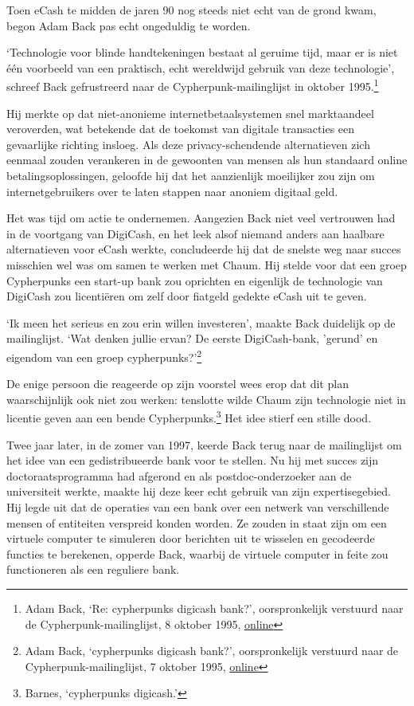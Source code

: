 \documentclass[smalldemyvopaper,11pt,twoside,onecolumn,openright,extrafontsizes,hidelinks]{memoir}
\begin{document}
Toen eCash te midden de jaren 90 nog steeds niet echt van de grond kwam,
begon Adam Back pas echt ongeduldig te worden.

`Technologie voor blinde handtekeningen bestaat al geruime tijd, maar er
is niet één voorbeeld van een praktisch, echt wereldwijd gebruik van
deze technologie', schreef Back gefrustreerd naar de
Cypherpunk-mailinglijst in oktober 1995.\footnote{Adam Back, `Re:
  cypherpunks digicash bank?', oorspronkelijk verstuurd naar de
  Cypherpunk-mailinglijst, 8 oktober 1995,
  \href{https://cypherpunks.venona.com/date/1995/10/msg00734.html}{online}}

Hij merkte op dat niet-anonieme internetbetaalsystemen snel marktaandeel
veroverden, wat betekende dat de toekomst van digitale transacties een
gevaarlijke richting insloeg. Als deze privacy-schendende alternatieven
zich eenmaal zouden verankeren in de gewoonten van mensen als hun
standaard online betalingsoplossingen, geloofde hij dat het aanzienlijk
moeilijker zou zijn om internetgebruikers over te laten stappen naar
anoniem digitaal geld.

Het was tijd om actie te ondernemen. Aangezien Back niet veel vertrouwen
had in de voortgang van DigiCash, en het leek alsof niemand anders aan
haalbare alternatieven voor eCash werkte, concludeerde hij dat de
snelste weg naar succes misschien wel was om samen te werken met Chaum.
Hij stelde voor dat een groep Cypherpunks een start-up bank zou
oprichten en eigenlijk de technologie van DigiCash zou licentiëren om
zelf door fiatgeld gedekte eCash uit te geven.

`Ik meen het serieus en zou erin willen investeren', maakte Back
duidelijk op de mailinglijst. `Wat denken jullie ervan? De eerste
DigiCash-bank, 'gerund' en eigendom van een groep
cypherpunks?'\footnote{Adam Back, `cypherpunks digicash bank?',
  oorspronkelijk verstuurd naar de Cypherpunk-mailinglijst, 7 oktober
  1995,
  \href{https://cypherpunks.venona.com/date/1995/10/msg00690.html}{online}}

De enige persoon die reageerde op zijn voorstel wees erop dat dit plan
waarschijnlijk ook niet zou werken: tenslotte wilde Chaum zijn
technologie niet in licentie geven aan een bende Cypherpunks.\footnote{Barnes,
  `cypherpunks digicash.'} Het idee stierf een stille dood.

Twee jaar later, in de zomer van 1997, keerde Back terug naar de
mailinglijst om het idee van een gedistribueerde bank voor te stellen.
Nu hij met succes zijn doctoraatsprogramma had afgerond en als
postdoc-onderzoeker aan de universiteit werkte, maakte hij deze keer
echt gebruik van zijn expertisegebied. Hij legde uit dat de operaties
van een bank over een netwerk van verschillende mensen of entiteiten
verspreid konden worden. Ze zouden in staat zijn om een virtuele
computer te simuleren door berichten uit te wisselen en gecodeerde
functies te berekenen, opperde Back, waarbij de virtuele computer in
feite zou functioneren als een reguliere bank.
\end{document}
